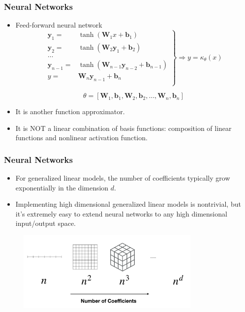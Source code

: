 \documentclass{beamer}
\newcommand{\by}{\mathbf{y}}
\begin{document}
\begin{frame}
\frametitle{Neural Networks}

\begin{itemize}
	\item Feed-forward neural network
	\begin{equation*}
\left.\begin{aligned}
\by_1 =& \tanh(\mathbf{W}_1 x + \mathbf{b}_1)\\
\by_2 =& \tanh(\mathbf{W}_2 \by_1 + \mathbf{b}_2)\\
\ldots\\
\by_{n-1} =& \tanh(\mathbf{W}_{n-1} \by_{n-2} + \mathbf{b}_{n-1})\\
y =& \mathbf{W}_n \by_{n-1} + \mathbf{b}_n\\
\end{aligned}  \right\} \Rightarrow y = \kappa_{\theta}(x)
\end{equation*}

$$\theta = [\mathbf{W}_1, \mathbf{b}_1, \mathbf{W}_2, \mathbf{b}_2, \ldots, \mathbf{W}_n, \mathbf{b}_n]$$

\item It is another function approximator.
\item It is NOT a linear combination of basis functions: composition of linear functions and nonlinear activation function. 
\end{itemize}

\end{frame}

\begin{frame}
	\frametitle{Neural Networks}

\begin{itemize}
	\item For generalized linear models, the number of coefficients typically grow exponentially in the dimension $d$.
	\item Implementing high dimensional  generalized linear models is nontrivial, but it's extremely easy to extend neural networks to any high dimensional input/output space. 
\end{itemize}
\begin{figure}[hbt]
  \includegraphics[width=0.8\textwidth]{figures/coef}
\end{figure}


\end{frame}
\end{document}
